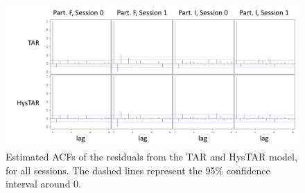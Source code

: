 \documentclass{article}
\begin{document}
\begin{figure}
\includegraphics[scale=.5]{resplots_SAT}
\caption{Estimated ACFs of the residuals from the TAR and HysTAR model, for all sessions. The dashed lines represent the 95\% confidence interval around 0.}
\end{figure}

\end{document}

